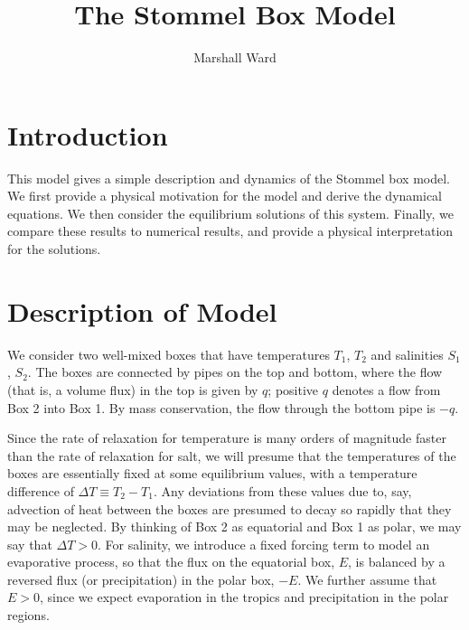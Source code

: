 \documentclass[letterpaper, 11pt]{article}
\title{The Stommel Box Model}
\author{Marshall Ward}
\begin{document}
\maketitle


\section{Introduction}

This model gives a simple description and dynamics of the Stommel box model. We first provide a physical motivation for the model and derive the dynamical equations. We then consider the equilibrium solutions of this system. Finally, we compare these results to numerical results, and provide a physical interpretation for the solutions.


\section{Description of Model}

We consider two well-mixed boxes that have temperatures $T_1$, $T_2$ and salinities $S_1$, $S_2$. The boxes are connected by pipes on the top and bottom, where the flow (that is, a volume flux) in the top is given by $q$; positive $q$ denotes a flow from Box 2 into Box 1. By mass conservation, the flow through the bottom pipe is $-q$.

Since the rate of relaxation for temperature is many orders of magnitude faster than the rate of relaxation for salt, we will presume that the temperatures of the boxes are essentially fixed at some equilibrium values, with a temperature difference of $\Delta T \equiv T_2 - T_1$. Any deviations from these values due to, say, advection of heat between the boxes are presumed to decay so rapidly that they may be neglected. By thinking of Box 2 as equatorial and Box 1 as polar, we may say that $\Delta T > 0$. For salinity, we introduce a fixed forcing term to model an evaporative process, so that the flux on the equatorial box, $E$, is balanced by a reversed flux (or precipitation) in the polar box, $-E$. We further assume that $E > 0$, since we expect evaporation in the tropics and precipitation in the polar regions.
\end{document}
